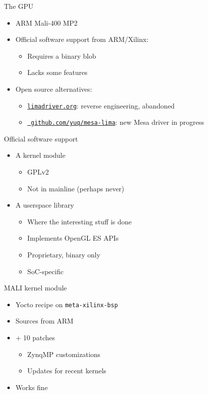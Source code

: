 \documentclass[xetex,table]{beamer}
\begin{document}
\begin{frame}{The GPU}
  \begin{itemize}
  \item ARM Mali-400 MP2
  \item Official software support from ARM/Xilinx:
    \begin{itemize}
    \item Requires a binary blob
    \item Lacks some features
    \end{itemize}
  \item Open source alternatives:
    \begin{itemize}
    \item \href{https://limadriver.org/}{\tt limadriver.org}: reverse
      engineering, abandoned
    \item \href{https://github.com/yuq/mesa-lima}{\tt
      github.com/yuq/mesa-lima}: new Mesa driver in progress
    \end{itemize}
  \end{itemize}
\end{frame}

\begin{frame}{Official software support}
  \begin{itemize}
  \item A kernel module
    \begin{itemize}
    \item GPLv2
    \item Not in mainline (perhaps never)
    \end{itemize}
  \item A userspace library
    \begin{itemize}
    \item Where the interesting stuff is done
    \item Implements OpenGL ES APIs
    \item Proprietary, binary only
    \item SoC-specific
    \end{itemize}
  \end{itemize}
\end{frame}

\begin{frame}{MALI kernel module}
  \begin{itemize}
  \item Yocto recipe on {\tt meta-xilinx-bsp}
  \item Sources from ARM
  \item + 10 patches
    \begin{itemize}
    \item ZynqMP customizations
    \item Updates for recent kernels
    \end{itemize}
  \item Works fine
  \end{itemize}
\end{frame}
\end{document}
